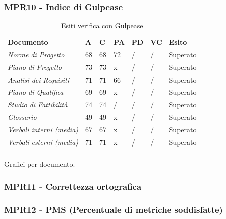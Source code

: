 \subsubsection{MPR10 - Indice di Gulpease}
\begin{center}
    \centering
    \renewcommand{\arraystretch}{1.8}
    \label{tab:IndiciGulpease}
    \begin{longtable}[!h]{p{100px} p{50px} p{50px} p{50px} p{50px} p{50px} p{50px}}
        \caption{Esiti verifica con Gulpease}                                                                                        \\
        \rowcolor{logo!70}   \textbf{Documento} & \textbf{A} & \textbf{C} & \textbf{PA} & \textbf{PD} & \textbf{VC} & \textbf{Esito} \\
        \textit{Norme di Progetto}              & 68         & 68         & 72          & /           & /           & Superato       \\
        \textit{Piano di Progetto}              & 73         & 73         & x           & /           & /           & Superato       \\
        \textit{Analisi dei Requisiti}          & 71         & 71         & 66          & /           & /           & Superato       \\
        \textit{Piano di Qualifica}             & 69         & 69         & x           & /           & /           & Superato       \\
        \textit{Studio di Fattibilità}          & 74         & 74         & /           & /           & /           & Superato       \\
        \textit{Glossario}                      & 49         & 49         & x           & /           & /           & Superato       \\
        \textit{Verbali interni (media)}        & 67         & 67         & x           & /           & /           & Superato       \\
        \textit{Verbali esterni (media)}        & 71         & 71         & x           & /           & /           & Superato       \\
        \rowcolor{white}
    \end{longtable}
\end{center}
Grafici per documento.
\subsubsection{MPR11 - Correttezza ortografica}
\subsubsection{MPR12 - PMS (Percentuale di metriche soddisfatte)}
\newpage